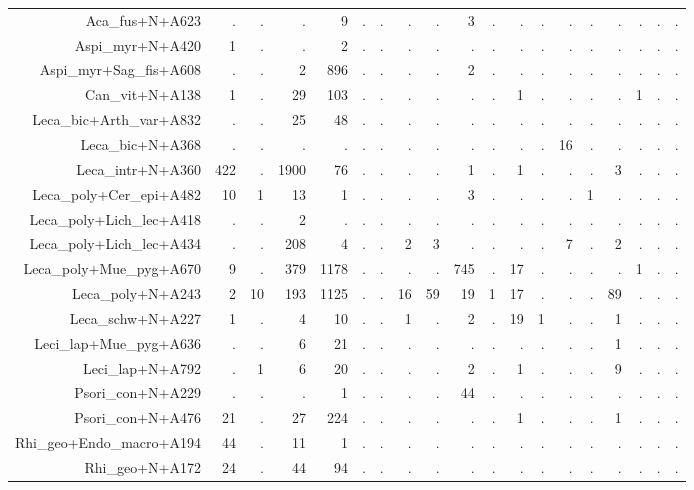 \documentclass[a4paper, 11]{article}\usepackage[]{graphicx}\usepackage[]{color}
\begin{document}
\begin{table}
\begin{tabular}{rrrrrrrrrrrrrrrrrrr}
  \hline
Aca\_fus+N+A623 & . & . & . & 9 & . & . & . & . & 3 & . & . & . & . & . & . & . & . & . \\ 
  Aspi\_myr+N+A420 & 1 & . & . & 2 & . & . & . & . & . & . & . & . & . & . & . & . & . & . \\ 
  Aspi\_myr+Sag\_fis+A608 & . & . & 2 & 896 & . & . & . & . & 2 & . & . & . & . & . & . & . & . & . \\ 
  Can\_vit+N+A138 & 1 & . & 29 & 103 & . & . & . & . & . & . & 1 & . & . & . & . & 1 & . & . \\ 
  Leca\_bic+Arth\_var+A832 & . & . & 25 & 48 & . & . & . & . & . & . & . & . & . & . & . & . & . & . \\ 
  Leca\_bic+N+A368 & . & . & . & . & . & . & . & . & . & . & . & . & 16 & . & . & . & . & . \\ 
  Leca\_intr+N+A360 & 422 & . & 1900 & 76 & . & . & . & . & 1 & . & 1 & . & . & . & 3 & . & . & . \\ 
  Leca\_poly+Cer\_epi+A482 & 10 & 1 & 13 & 1 & . & . & . & . & 3 & . & . & . & . & 1 & . & . & . & . \\ 
  Leca\_poly+Lich\_lec+A418 & . & . & 2 & . & . & . & . & . & . & . & . & . & . & . & . & . & . & . \\ 
  Leca\_poly+Lich\_lec+A434 & . & . & 208 & 4 & . & . & 2 & 3 & . & . & . & . & 7 & . & 2 & . & . & . \\ 
  Leca\_poly+Mue\_pyg+A670 & 9 & . & 379 & 1178 & . & . & . & . & 745 & . & 17 & . & . & . & . & 1 & . & . \\ 
  Leca\_poly+N+A243 & 2 & 10 & 193 & 1125 & . & . & 16 & 59 & 19 & 1 & 17 & . & . & . & 89 & . & . & . \\ 
  Leca\_schw+N+A227 & 1 & . & 4 & 10 & . & . & 1 & . & 2 & . & 19 & 1 & . & . & 1 & . & . & . \\ 
  Leci\_lap+Mue\_pyg+A636 & . & . & 6 & 21 & . & . & . & . & . & . & . & . & . & . & 1 & . & . & . \\ 
  Leci\_lap+N+A792 & . & 1 & 6 & 20 & . & . & . & . & 2 & . & 1 & . & . & . & 9 & . & . & . \\ 
  Psori\_con+N+A229 & . & . & . & 1 & . & . & . & . & 44 & . & . & . & . & . & . & . & . & . \\ 
  Psori\_con+N+A476 & 21 & . & 27 & 224 & . & . & . & . & . & . & 1 & . & . & . & 1 & . & . & . \\ 
  Rhi\_geo+Endo\_macro+A194 & 44 & . & 11 & 1 & . & . & . & . & . & . & . & . & . & . & . & . & . & . \\ 
  Rhi\_geo+N+A172 & 24 & . & 44 & 94 & . & . & . & . & . & . & . & . & . & . & . & . & . & . \\ 

\end{tabular}
\end{table}
\end{document}
